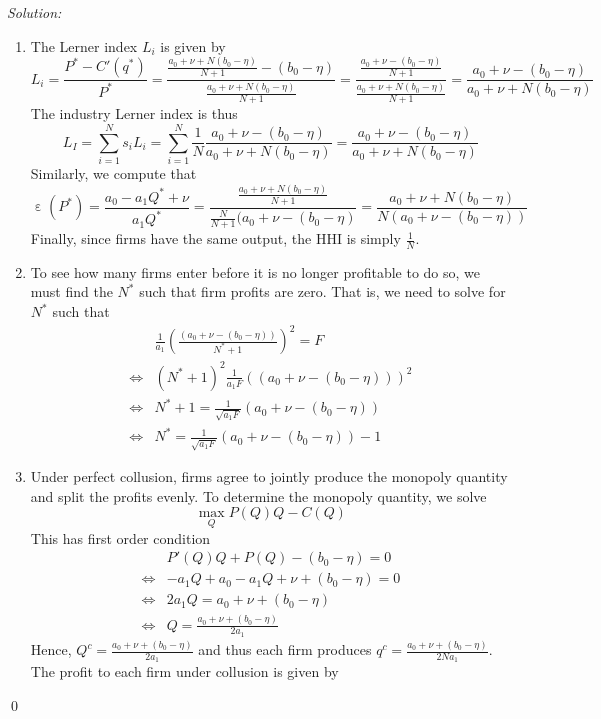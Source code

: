 \documentclass[12pt]{article}
\DeclareMathOperator{\eps}{\varepsilon}
\newenvironment{sol}
    {\emph{Solution:}
    }
    {
    \qed
    }
\begin{document}
\begin{sol}
\begin{enumerate}[label=\alph*) ]
     \item The Lerner index $L_i$ is given by
     \[L_i = \frac{P^* - C'(q^*)}{P^*} = \frac{\frac{a_0 + \nu + N(b_0 - \eta)}{N+1} - (b_0 - \eta)}{\frac{a_0 + \nu + N(b_0 - \eta)}{N+1} } = \frac{\frac{a_0 + \nu - (b_0 - \eta)}{N+1}}{\frac{a_0 + \nu + N(b_0 - \eta)}{N+1}} = \frac{a_0 + \nu - (b_0 - \eta)}{a_0 + \nu + N(b_0 - \eta)}\]
     The industry Lerner index is thus
     \[L_I = \sum_{i=1}^N s_i L_i = \sum_{i=1}^N \frac{1}{N} \frac{a_0 + \nu - (b_0 - \eta)}{a_0 + \nu + N(b_0 - \eta)} =\frac{a_0 + \nu - (b_0 - \eta)}{a_0 + \nu + N(b_0 - \eta)} \]
     Similarly, we compute that
     \[\eps(P^*) = \frac{a_0 - a_1 Q^* + \nu}{a_1 Q^*} = \frac{\frac{a_0 + \nu + N(b_0 - \eta)}{N+1}}{\frac{N}{N+1}(a_0 + \nu - (b_0 - \eta)} = \frac{a_0 + \nu + N(b_0 - \eta)}{N(a_0 + \nu - (b_0 - \eta))}\]
     Finally, since firms have the same output, the HHI is simply $\frac{1}{N}$.
     \item To see how many firms enter before it is no longer profitable to do so, we must find the $N^*$ such that firm profits are zero. That is, we need to solve for $N^*$ such that
     \begin{align*}
        &\frac{1}{a_1}\left(\frac{(a_0 + \nu - (b_0 - \eta))}{N^*+1}\right)^2 = F\\
        \iff & (N^*+1)^2\frac{1}{a_1 F }\left((a_0 + \nu - (b_0 - \eta))\right)^2\\
        \iff& N^* +1 = \frac{1}{\sqrt{a_1 F}}(a_0 + \nu - (b_0 - \eta))\\
        \iff& N^* =  \frac{1}{\sqrt{a_1 F}}(a_0 + \nu - (b_0 - \eta)) - 1
     \end{align*}
     \item Under perfect collusion, firms agree to jointly produce the monopoly quantity and split the profits evenly. To determine the monopoly quantity, we solve
     \[\max_{Q} P(Q)Q - C(Q)\]
     This has first order condition
     \begin{align*}
        &P'(Q) Q + P(Q) - (b_0 - \eta) = 0\\
        \iff & - a_1 Q + a_0 - a_1Q + \nu + (b_0 - \eta) = 0\\
        \iff & 2 a_1 Q = a_0 + \nu + (b_0 - \eta)\\
        \iff & Q = \frac{a_0 + \nu + (b_0 - \eta)}{2 a_1}
     \end{align*}
     Hence, $Q^c = \frac{a_0 + \nu + (b_0 - \eta)}{2 a_1}$ and thus each firm produces $q^c = \frac{a_0 + \nu + (b_0 - \eta)}{2 N a_1}$. The profit to each firm under collusion is given by

\end{enumerate}
\end{sol}
\end{document}
